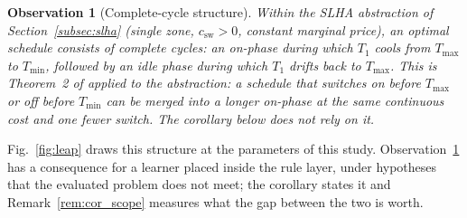 \documentclass[pdflatex,sn-mathphys-num,iicol]{sn-jnl}
\theoremstyle{thmstyleone}\newtheorem{proposition}{Proposition}\newtheorem{corollary}{Corollary}
\theoremstyle{thmstyletwo}\newtheorem{remark}{Remark}\newtheorem{observation}{Observation}
\theoremstyle{thmstylethree}\newtheorem{definition}{Definition}
\newcommand{\Tmin}{T_{\min}}
\newcommand{\Tmax}{T_{\max}}
\newcommand{\csw}{c_{\mathrm{sw}}}
\begin{document}
\begin{observation}[Complete-cycle structure]
\label{prop:structure}
Within the SLHA abstraction of Section~\ref{subsec:slha} (single zone, $\csw>0$, constant marginal price), an optimal schedule consists of \emph{complete cycles}: an on-phase during which $T_1$ cools from $\Tmax$ to $\Tmin$, followed by an idle phase during which $T_1$ drifts back to $\Tmax$. This is Theorem~2 of \citep{Mousa2016} applied to the abstraction: a schedule that switches on before $\Tmax$ or off before $\Tmin$ can be merged into a longer on-phase at the same continuous cost and one fewer switch. The corollary below does not rely on it.
\end{observation}



Fig.~\ref{fig:leap} draws this structure at the parameters of this study. Observation~\ref{prop:structure} has a consequence for a learner placed inside the rule layer, under hypotheses that the evaluated problem does not meet; the corollary states it and Remark~\ref{rem:cor_scope} measures what the gap between the two is worth.
\end{document}
